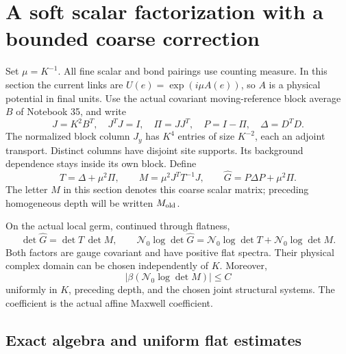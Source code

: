 \section{A soft scalar factorization with a bounded coarse correction}
\label{ssc-section}

Set \(\mu=K^{-1}\). All fine scalar and bond pairings use counting
measure. In this section the current links are
\(U(e)=\exp(i\mu A(e))\), so \(A\) is a physical potential in final
units. Use the actual covariant moving-reference block average \(B\)
of Notebook 35, and write
\begin{equation}
 J=K^2B^T,\quad J^TJ=I,\quad \Pi=JJ^T,\quad P=I-\Pi,
 \quad \Delta=D^TD.
 \label{ssc-data}
\end{equation}
The normalized block column \(J_y\) has \(K^4\) entries of size
\(K^{-2}\), each an adjoint transport. Distinct columns have disjoint
site supports. Its background dependence stays inside its own block.
Define
\begin{equation}
 T=\Delta+\mu^2\Pi,\qquad
 M=\mu^2J^TT^{-1}J,\qquad
 \widehat G=P\Delta P+\mu^2\Pi .
 \label{ssc-soft}
\end{equation}
The letter \(M\) in this section denotes this coarse scalar matrix;
preceding homogeneous depth will be written \(M_{\rm old}\).

\begin{theorem}
\label{ssc-factorization}
On the actual local germ, continued through flatness,
\begin{equation}
 \det\widehat G=\det T\,\det M,\qquad
 \mathcal N_0\log\det\widehat G
   =\mathcal N_0\log\det T+\mathcal N_0\log\det M .
 \label{ssc-determinant}
\end{equation}
Both factors are gauge covariant and have positive flat spectra.
Their physical complex domain can be chosen independently of \(K\).
Moreover,
\begin{equation}
 \left|\beta(\mathcal N_0\log\det M)\right|\le C
 \label{ssc-coarse-bound}
\end{equation}
uniformly in \(K\), preceding depth, and the chosen joint structural
systems. The coefficient is the actual affine Maxwell coefficient.
\end{theorem}

\subsection{Exact algebra and uniform flat estimates}

